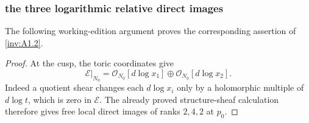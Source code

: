 \subsubsection{the three logarithmic relative direct images}\label{inv:wbproof:prop:log-relative-direct-images}
The following working-edition argument proves the corresponding assertion of \cref{inv:A1.2}.


\begin{proof}
At the cusp, the toric coordinates give
\[
 \mathcal E|_{N_0}
 =\mathcal O_{N_0}[d\log x_1]\oplus
  \mathcal O_{N_0}[d\log x_2].
\tag{WBH.11.3}\label{inv:wb:eq:11.3}
\]
Indeed a quotient shear changes each $d\log x_i$ only by a holomorphic
multiple of $d\log t$, which is zero in $\mathcal E$.  The already proved
structure-sheaf calculation therefore gives free local direct images of
ranks $2,4,2$ at $p_0$.


\end{proof}
